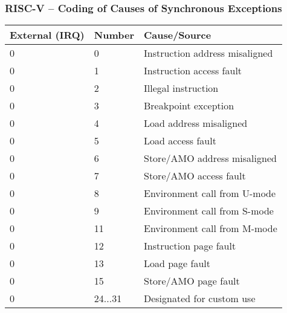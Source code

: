 \documentclass{beamer}
\begin{document}
\begin{frame}
\frametitle{RISC-V -- Coding of Causes of Synchronous Exceptions}

\begin{center}
\small
\begin{tabular}{|l|l|l|}  \hline
External (IRQ) & Number & Cause/Source \\\hline
0 & 0 &Instruction address misaligned \\\hline
0 & 1 & Instruction access fault \\\hline
0 & 2 & Illegal instruction \\\hline
0 & 3 & Breakpoint exception \\\hline
0 & 4 & Load address misaligned \\\hline
0 & 5 & Load access fault \\\hline
0 & 6 & Store/AMO address misaligned \\\hline
0 & 7 & Store/AMO access fault \\\hline
0 & 8 & Environment call from U-mode \\\hline
0 & 9 & Environment call from S-mode \\\hline
0 & 11 & Environment call from M-mode \\\hline
0 & 12 & Instruction page fault \\\hline
0 & 13 & Load page fault \\\hline
0 & 15 & Store/AMO page fault \\\hline
0 & 24...31 &Designated for custom use \\\hline
\end{tabular}
\end{center}
\end{frame}
\end{document}
